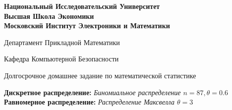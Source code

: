 \documentclass[14pt,a4paper,oneside]{extbook}
\begin{document}
	
	
	\begin{titlepage}                                                         
		\newpage                                                                        
		\begin{center}                                                        
			{\bfseries Национальный Исследовательский Университет \\
				Высшая Школа Экономики \\
				Московский Институт Электроники и Математики}                               
			\vspace{1cm}                                                          
			
			Департамент Прикладной Математики
			
			Кафедра Компьютерной Безопасности                                                              
			\vspace{6em}                                                          
			
			
			
			
			
			
			
		\end{center}                                                          
		
		\vspace{1.2em}                                                        
		
		\begin{center}                                                        
			\Large Долгосрочное домашнее задание по математической
			статистике\linebreak                                  
			
			
		\end{center}                                            
		\begin{center}
			\textbf{Дискретное распределение:}\textit{ Биномиальное распределение $n = 87, \theta = 0.6$}\\
			\textbf{Равномерное распределение:} \textit{ Распределение Максвелла $\theta = 3$}
		\end{center}
		

\end{titlepage}
\end{document}
